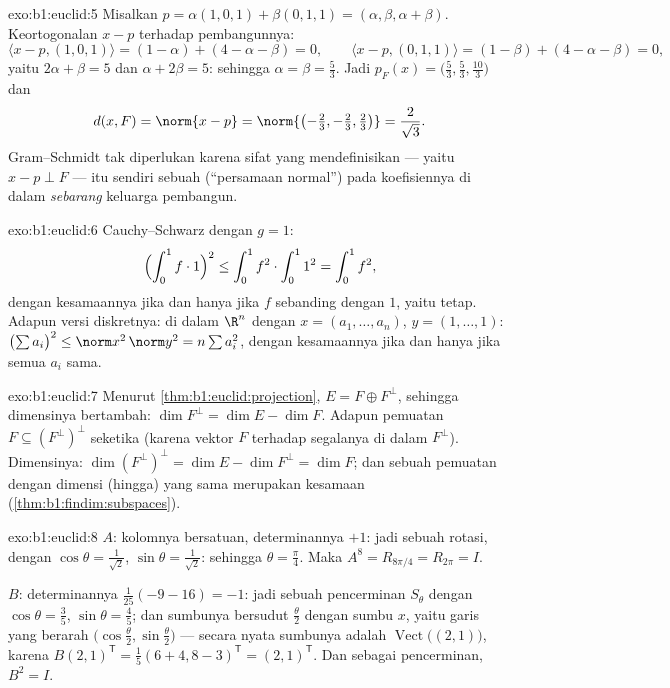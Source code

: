 \begin{solution}{exo:b1:euclid:5}
Misalkan $p = \alpha(1,0,1) + \beta(0,1,1) = (\alpha, \beta, \alpha +
\beta)$. Keortogonalan $x - p$ terhadap pembangunnya:
\[
\langle x - p, (1,0,1)\rangle = (1 - \alpha) + (4 - \alpha - \beta)
= 0,
\qquad
\langle x - p, (0,1,1)\rangle = (1 - \beta) + (4 - \alpha - \beta)
= 0,
\]
yaitu $2\alpha + \beta = 5$ dan $\alpha + 2\beta = 5$: sehingga $\alpha =
\beta = \frac53$. Jadi $p_F(x) = \bigl(\frac53, \frac53,
\frac{10}{3}\bigr)$ dan
\[
d(x, F) = \norm{x - p} =
\norm{\bigl(-\tfrac23, -\tfrac23, \tfrac23\bigr)} =
\frac{2}{\sqrt 3} .
\]
Gram--Schmidt tak diperlukan karena sifat yang mendefinisikan
 --- yaitu $x - p \perp F$ --- itu sendiri sebuah 
(``persamaan normal'') pada koefisiennya di dalam \emph{sebarang} keluarga
pembangun.
\end{solution}

\begin{solution}{exo:b1:euclid:6}
Cauchy--Schwarz dengan $g = 1$:
\[
\Bigl(\int_0^1 f \cdot 1\Bigr)^2 \leq \int_0^1 f^2 \cdot \int_0^1
1^2 = \int_0^1 f^2 ,
\]
dengan kesamaannya jika dan hanya jika $f$ sebanding dengan $1$, yaitu tetap. Adapun
versi diskretnya: di dalam $\R^n$ dengan $x = (a_1, \dots, a_n)$, $y = (1, \dots,
1)$:
$\bigl(\sum a_i\bigr)^2 \leq \norm x^2\, \norm y^2 = n \sum a_i^2$,
dengan kesamaannya jika dan hanya jika semua $a_i$ sama.
\end{solution}

\begin{solution}{exo:b1:euclid:7}
Menurut \cref{thm:b1:euclid:projection}, $E = F \oplus F^\perp$, sehingga
dimensinya bertambah: $\dim F^\perp = \dim E - \dim F$. Adapun pemuatan $F
\subseteq (F^\perp)^\perp$ seketika (karena vektor $F$
 terhadap segalanya di dalam $F^\perp$). Dimensinya:
$\dim(F^\perp)^\perp = \dim E - \dim F^\perp = \dim F$; dan sebuah
pemuatan dengan dimensi (hingga) yang sama merupakan kesamaan
(\cref{thm:b1:findim:subspaces}).
\end{solution}

\begin{solution}{exo:b1:euclid:8}
$A$: kolomnya bersatuan, determinannya $+1$: jadi sebuah rotasi, dengan $\cos\theta =
\frac{1}{\sqrt2}$, $\sin\theta = \frac{1}{\sqrt2}$: sehingga $\theta =
\frac\pi4$. Maka $A^8 = R_{8\pi/4} = R_{2\pi} = I$.

$B$: determinannya $\frac{1}{25}(-9 - 16) = -1$: jadi sebuah pencerminan
$S_\theta$ dengan $\cos\theta = \frac35$, $\sin\theta = \frac45$; dan
sumbunya bersudut $\frac\theta2$ dengan sumbu $x$, yaitu
garis yang berarah $\bigl(\cos\frac\theta2, \sin\frac\theta2\bigr)$
--- secara nyata sumbunya adalah
$\operatorname{Vect}\bigl((2, 1)\bigr)$, karena $B(2,1)^{\mathsf T} =
\frac15(6+4, 8-3)^{\mathsf T} = (2,1)^{\mathsf T}$. Dan sebagai pencerminan,
$B^2 = I$.
\end{solution}

